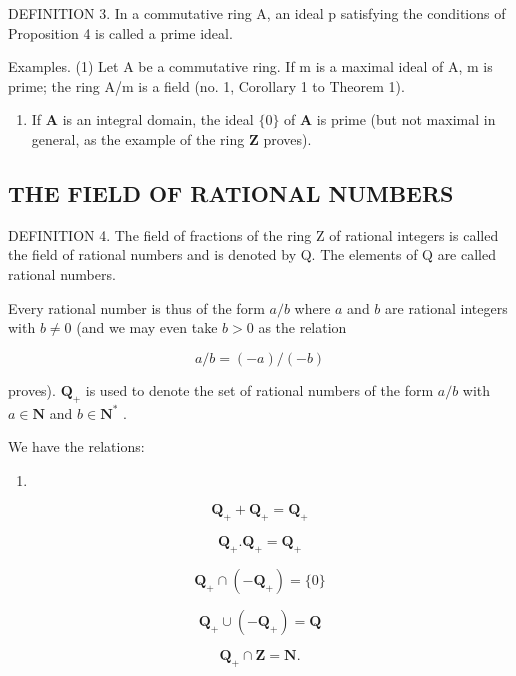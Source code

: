 DEFINITION 3. In a commutative ring A, an ideal p satisfying the conditions of Proposition 4 is called a prime ideal.

Examples. (1) Let A be a commutative ring. If m is a maximal ideal of A, m is prime; the ring A/m is a field (no. 1, Corollary 1 to Theorem 1).

\begin{enumerate}
\def\labelenumi{(\arabic{enumi})}
\setcounter{enumi}{1}
\tightlist
\item
  If \(\mathbf{A}\) is an integral domain, the ideal \(\{0\}\) of \(\mathbf{A}\) is prime (but not maximal in general, as the example of the ring \(\mathbf{Z}\) proves).
\end{enumerate}

\subsection{THE FIELD OF RATIONAL NUMBERS}

DEFINITION 4. The field of fractions of the ring Z of rational integers is called the field of rational numbers and is denoted by Q. The elements of Q are called rational numbers.

Every rational number is thus of the form \(a / b\) where \(a\) and \(b\) are rational integers with \(b \neq 0\) (and we may even take \(b > 0\) as the relation

\[
a / b = (- a) / (- b)
\]

proves). \(\mathbf{Q}_{+}\) is used to denote the set of rational numbers of the form \(a / b\) with \(a\in \mathbf{N}\) and \(b\in \mathbf{N}^*\) .

We have the relations:

\begin{enumerate}
\def\labelenumi{(\arabic{enumi})}
\tightlist
\item
\end{enumerate}

\[
\mathbf {Q} _ {+} + \mathbf {Q} _ {+} = \mathbf {Q} _ {+}\tag{2}
\]

\[
\mathbf {Q} _ {+}. \mathbf {Q} _ {+} = \mathbf {Q} _ {+}\tag{3}
\]

\[
\mathbf {Q} _ {+} \cap (- \mathbf {Q} _ {+}) = \{0 \}\tag{4}
\]

\[
\mathbf {Q} _ {+} \cup (- \mathbf {Q} _ {+}) = \mathbf {Q}\tag{5}
\]

\[
\mathbf {Q} _ {+} \cap \mathbf {Z} = \mathbf {N}.
\]

